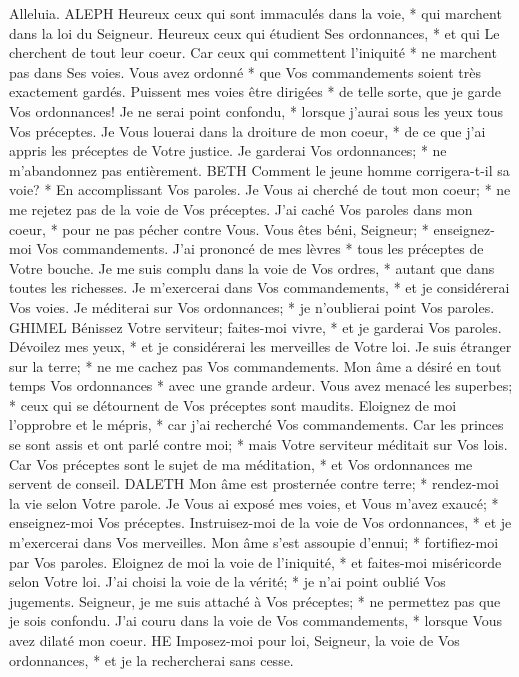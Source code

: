 Alleluia.
ALEPH
Heureux ceux qui sont immaculés dans la voie, * qui marchent dans la loi du Seigneur.
Heureux ceux qui étudient Ses ordonnances, * et qui Le cherchent de tout leur coeur.
Car ceux qui commettent l'iniquité * ne marchent pas dans Ses voies.
Vous avez ordonné * que Vos commandements soient très exactement gardés.
Puissent mes voies être dirigées * de telle sorte, que je garde Vos ordonnances!
Je ne serai point confondu, * lorsque j'aurai sous les yeux tous Vos préceptes.
Je Vous louerai dans la droiture de mon coeur, * de ce que j'ai appris les préceptes de Votre justice.
Je garderai Vos ordonnances; * ne m'abandonnez pas entièrement.
BETH
Comment le jeune homme corrigera-t-il sa voie? * En accomplissant Vos paroles.
Je Vous ai cherché de tout mon coeur; * ne me rejetez pas de la voie de Vos préceptes.
J'ai caché Vos paroles dans mon coeur, * pour ne pas pécher contre Vous.
Vous êtes béni, Seigneur; * enseignez-moi Vos commandements.
J'ai prononcé de mes lèvres * tous les préceptes de Votre bouche.
Je me suis complu dans la voie de Vos ordres, * autant que dans toutes les richesses.
Je m'exercerai dans Vos commandements, * et je considérerai Vos voies.
Je méditerai sur Vos ordonnances; * je n'oublierai point Vos paroles.
GHIMEL
Bénissez Votre serviteur; faites-moi vivre, * et je garderai Vos paroles.
Dévoilez mes yeux, * et je considérerai les merveilles de Votre loi.
Je suis étranger sur la terre; * ne me cachez pas Vos commandements.
Mon âme a désiré en tout temps Vos ordonnances * avec une grande ardeur.
Vous avez menacé les superbes; * ceux qui se détournent de Vos préceptes sont maudits.
Eloignez de moi l'opprobre et le mépris, * car j'ai recherché Vos commandements.
Car les princes se sont assis et ont parlé contre moi; * mais Votre serviteur méditait sur Vos lois.
Car Vos préceptes sont le sujet de ma méditation, * et Vos ordonnances me servent de conseil.
DALETH
Mon âme est prosternée contre terre; * rendez-moi la vie selon Votre parole.
Je Vous ai exposé mes voies, et Vous m'avez exaucé; * enseignez-moi Vos préceptes.
Instruisez-moi de la voie de Vos ordonnances, * et je m'exercerai dans Vos merveilles.
Mon âme s'est assoupie d'ennui; * fortifiez-moi par Vos paroles.
Eloignez de moi la voie de l'iniquité, * et faites-moi miséricorde selon Votre loi.
J'ai choisi la voie de la vérité; * je n'ai point oublié Vos jugements.
Seigneur, je me suis attaché à Vos préceptes; * ne permettez pas que je sois confondu.
J'ai couru dans la voie de Vos commandements, * lorsque Vous avez dilaté mon coeur.
HE
Imposez-moi pour loi, Seigneur, la voie de Vos ordonnances, * et je la rechercherai sans cesse.
